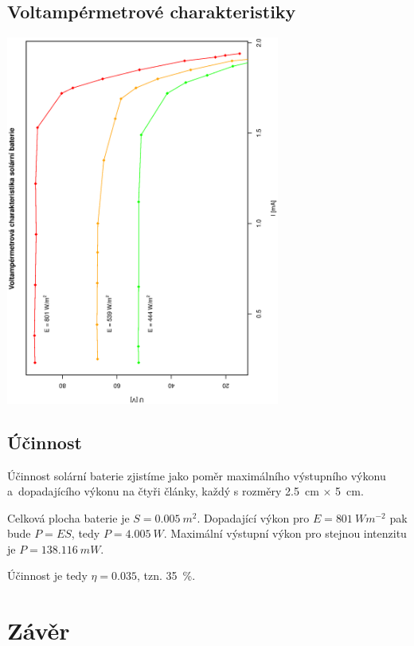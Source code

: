 \documentclass[10pt]{article}
\begin{document}
\subsection{Voltampérmetrové charakteristiky}
\begin{center}
\includegraphics[width=9cm,angle=270]{graf3.eps} \\[1cm]
\end{center}

\subsection{Účinnost}
Účinnost solární baterie zjistíme jako poměr maximálního výstupního výkonu 
a~dopadajícího výkonu na čtyři články, každý s rozměry 2.5~cm $\times$ 5~cm.

Celková plocha baterie je $S = 0.005~m^2$. Dopadající výkon pro $E =
801~Wm^{-2}$ pak bude $P = ES$, tedy $P = 4.005~W$. Maximální výstupní výkon 
pro stejnou intenzitu je $P = 138.116~mW$.

Účinnost je tedy $\eta = 0.035$, tzn. 35~\%.

\section{Závěr} 
\end{document}
